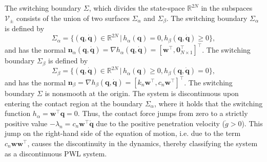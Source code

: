 \documentclass[a4paper,9pt,parskip=half,english]{article}
\theoremstyle{plain}
\theoremstyle{definition}
\newcommand{\T}{^{\!\top}} %
\newcommand{\mR}{\mathbb{R}}
\newcommand{\vn}{\mathbf n}
\newcommand{\vq}{\mathbf q}
\newcommand{\vw}{\mathbf w}
\begin{document}
The switching boundary $\Sigma$, which divides the state-space $\mR^{2N}$ in the subspaces $\mathcal{V}_\pm$ consists of the union of two surfaces $\Sigma_\alpha$ and $\Sigma_\beta$. The switching boundary $\Sigma_\alpha$ is defined by 
\begin{equation}
	\Sigma_\alpha = \{ (\vq,\dot{\vq}) \in \mR^{2N} \, | \, h_\alpha(\vq) = 0 , h_\beta(\vq,\dot{\vq}) \geq 0  \},
\end{equation}
and has the normal $\vn_\alpha(\vq,\dot{\vq}) = \nabla h_\alpha(\vq,\dot{\vq}) = [ \vw\T , \bm{0}_{N\times 1}\T ]\T$. The switching boundary $\Sigma_\beta$ is defined by 
\begin{equation}
	\Sigma_\beta = \{ (\vq,\dot{\vq}) \in \mR^{2N} \, | \, h_\alpha(\vq) \geq 0 , h_\beta(\vq, \dot{\vq}) = 0 \},
\end{equation} 
and has the normal $\vn_\beta = \nabla h_\beta(\vq,\dot{\vq}) = [ k_n \vw\T , c_n \vw\T]\T$. The switching boundary $\Sigma$ is nonsmooth at the origin. 
The system is discontinuous upon entering the contact region at  the boundary $\Sigma_\alpha$, where it holds that the switching function $h_\alpha = \vw\T \vq = 0$. Thus, the contact force jumps from zero to a strictly positive value $- \lambda_n= c_n \vw\T \dot{\vq}$ due to the positive penetration velocity ($\dot{g}>0$). This jump on the right-hand side of the equation of motion, i.e. due to the term $c_n\vw\vw\T$, causes the discontinuity in the dynamics, thereby classifying the system as a discontinuous PWL system.
\end{document}
